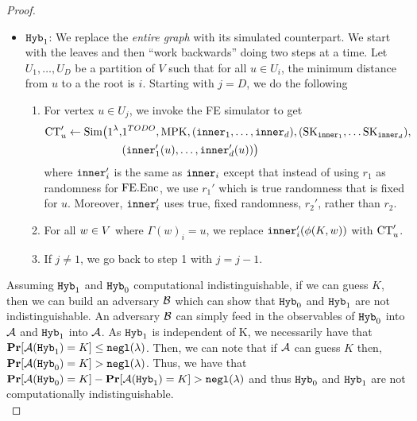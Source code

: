 \begin{lemma}
\begin{proof}
\begin{itemize}
			\item $\texttt{Hyb}_1$: We replace the \emph{entire graph} with its simulated counterpart.
			We start with the leaves and then ``work backwards'' doing two steps at a time.
			Let $U_1, \dots, U_D$ be a partition of $V$ such that for all $u \in U_i$, the minimum distance from $u$ to a the root is $i$.
			Starting with $j = D$, we do the following
			\begin{enumerate}
				\item For vertex $u \in U_j$, we invoke the FE simulator to get
				\begin{align*}
						\text{CT}_{u}' \gets \text{Sim}\big(1^\lambda, &1^{TODO}, \text{MPK}, (\texttt{inner}_1, \dots, \texttt{inner}_d), (\text{SK}_{\texttt{inner}_1}, \dots \text{SK}_{\texttt{inner}_d}),\\
							&(\texttt{inner}'_1(u), \dots, \texttt{inner}'_d(u))\big)
				\end{align*}
				where $\texttt{inner}'_i$ is the same as $\texttt{inner}_i$ except that instead of using $r_1$ as randomness for $\text{FE.Enc}$, we use $r_1'$ which is true randomness that is fixed for $u$.
				Moreover, $\texttt{inner}'_i$ uses true, fixed randomness, $r_2'$, rather than $r_2$.
				\item For all $w \in V$ where $\Gamma(w)_i = u$, we replace $\texttt{inner}'_i(\phi(K, w))$ with $\text{CT}_{u}'$.
				\label{alg:proof:neighb:replace}
				\item If $j \neq 1$, we go back to step 1 with $j = j - 1$.
			\end{enumerate}
		\end{itemize}
		Assuming $\texttt{Hyb}_1$ and $\texttt{Hyb}_0$ computational indistinguishable, if we can guess $K$, then we can build an adversary $\mathcal{B}$ which can show that $\texttt{Hyb}_0$ and $\texttt{Hyb}_1$ are not indistinguishable.
		An adversary $\mathcal{B}$ can simply feed in the observables of $\texttt{Hyb}_0$ into $\mathcal{A}$ and $\texttt{Hyb}_1$ into $\mathcal{A}$.
		As $\texttt{Hyb}_1$ is independent of K, we necessarily have that $\operatorname*{\mathbf{Pr}}[\mathcal{A}(\texttt{Hyb}_1) = K] \leq \texttt{negl}(\lambda)$.
		Then, we can note that if $\mathcal{A}$ can guess $K$ then, $\operatorname*{\mathbf{Pr}}[\mathcal{A}(\texttt{Hyb}_0) = K] > \texttt{negl}(\lambda)$.
		Thus, we have that $\operatorname*{\mathbf{Pr}}[\mathcal{A}(\texttt{Hyb}_0) = K] - \operatorname*{\mathbf{Pr}}[\mathcal{A}(\texttt{Hyb}_1) = K] > \texttt{negl}(\lambda)$ and thus $\texttt{Hyb}_0$ and $\texttt{Hyb}_1$ are not computationally indistinguishable.	\\



\end{proof}
\end{lemma}
